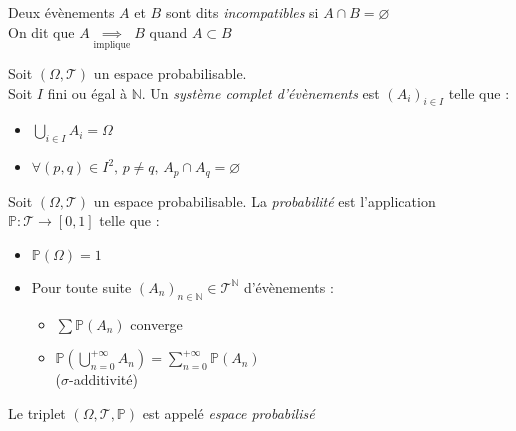 \documentclass[11pt,a4paper,fleqn,pdftex]{report}
\begin{document}
\begin{dfn}
     Deux évènements $A$ et $B$ sont dits \emph{incompatibles} si $A \cap B = \varnothing$\\
     On dit que $A \underset{\text{implique}}{\implies} B$ quand $A \subset B$
\end{dfn}
\begin{dfn}
     Soit $(\Omega, \mathscr{T})$ un espace probabilisable.\\
     Soit $I$ fini ou égal à $\mathbb{N}$.\newline
     Un \emph{système complet d'évènements} est  $(A_i)_{i\in I}$ telle que :
     \begin{itemize}
         \item $\bigcup_{i\in I} A_i = \Omega$
         \item $\forall (p,q) \in I^2,\, p\neq q,\, A_p \cap A_q = \varnothing$
     \end{itemize}
\end{dfn}
\begin{dfn}[Probabilité]\label{dfn:probabilite}
     Soit $(\Omega, \mathscr{T})$ un espace probabilisable. La \emph{probabilité} est l'application $\mathbb{P} : \mathscr{T} \to [0,1]$ telle que :
     \begin{itemize}
         \item $\mathbb{P}(\Omega) = 1$
         \item Pour toute suite $(A_n)_{n\in\mathbb{N}} \in \mathscr{T}^\mathbb{N}$ d'évènements  : 
         \begin{itemize}
             \item $\sum \mathbb{P}(A_n)$ converge
             \item $\mathbb{P}\left( \bigcup_{n=0}^{+\infty} A_n \right) = \sum_{n=0}^{+\infty} \mathbb{P}(A_n)$\\
             ($\sigma$-additivité)
         \end{itemize}
     \end{itemize}
     Le triplet $(\Omega, \mathscr{T},\mathbb{P})$ est appelé \emph{espace probabilisé}
\end{dfn}
\\[\baselineskip]
\end{document}
